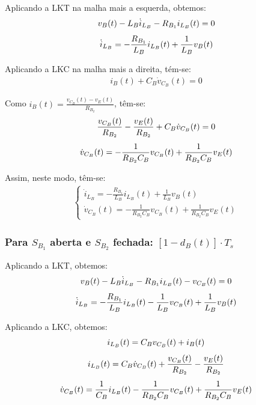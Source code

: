 \documentclass{article}
\newcommand{\nle}{%
  \notag \\[4pt]
}
\begin{document}
Aplicando a LKT na malha mais a esquerda, obtemos:
\begin{gather}
  v_B(t) - L_B \dot{i}_{L_B} - R_{B_1} i_{L_B} (t) = 0 \nle
  \dot{i}_{L_B} = - \frac{R_{B_1}}{L_B} i_{L_B}(t) + \frac{1}{L_B} v_B(t)
\end{gather}

Aplicando a LKC na malha mais a direita, tém-se:
\begin{gather}
  i_B(t) + C_B \dot{v}_{C_B}(t) = 0
\end{gather}

Como $i_B(t) = \frac{v_{C_B}(t) - v_E(t)}{R_{B_2}}$, têm-se:
\begin{gather}
  \frac{v_{C_B}(t)}{R_{B_2}} - \frac{v_E(t)}{R_{B_2}} + C_B \dot{v}_{C_B}(t) = 0 \nle
  \dot{v}_{C_B}(t) = - \frac{1}{R_{B_2} C_B} v_{C_B}(t) + \frac{1}{R_{B_2} C_B} v_{E}(t)
\end{gather}

Assim, neste modo, têm-se:
\begin{gather}
  \begin{cases}
    \dot{i}_{L_B} = \displaystyle - \frac{R_{B_1}}{L_B} i_{L_B}(t) + \frac{1}{L_B} v_B(t) \\[8pt]
    \dot{v}_{C_B}(t) = \displaystyle - \frac{1}{R_{B_2} C_B} v_{C_B}(t) + \frac{1}{R_{B_2} C_B} v_{E}(t)
  \end{cases}
\end{gather}

\vspace*{8pt}
\subsubsection*{Para $S_{B_1}$ aberta e $S_{B_2}$ fechada: $\left[1 - d_B(t)\right] \cdot T_s$}

Aplicando a LKT, obtemos:
\begin{gather}
  v_B(t) - L_B \dot{i}_{L_B} - R_{B_1} i_{L_B} (t) - v_{C_B} (t)= 0 \nle
  \dot{i}_{L_B} = - \frac{R_{B_1}}{L_B} i_{L_B}(t) - \frac{1}{L_B} v_{C_B} (t) + \frac{1}{L_B} v_B(t)
\end{gather}

Aplicando a LKC, obtemos:
\begin{gather}
  i_{L_B}(t) = C_B v_{C_B}(t) + i_B(t) \nle
  i_{L_B}(t) = C_B \dot{v}_{C_B}(t) +  \frac{v_{C_B}(t)}{R_{B_2}} - \frac{v_E(t)}{R_{B_2}} \nle
  \dot{v}_{C_B}(t) =  \frac{1}{C_B} i_{L_B}(t) - \frac{1}{R_{B_2}C_B} v_{C_B}(t) + \frac{1}{R_{B_2} C_B} v_E(t)
\end{gather}
\end{document}
